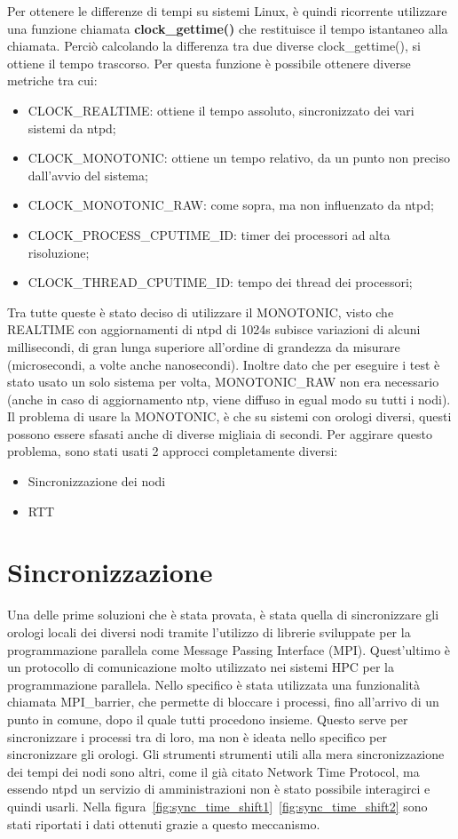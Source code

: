 Per ottenere le differenze di tempi su sistemi Linux, è quindi ricorrente utilizzare una funzione chiamata \textbf{clock\_gettime()} che restituisce il tempo istantaneo alla chiamata. Perciò calcolando la differenza tra due diverse clock\_gettime(), si ottiene il tempo trascorso.
Per questa funzione è possibile ottenere diverse metriche tra cui:
\begin{itemize}
    \item CLOCK\_REALTIME: ottiene il tempo assoluto, sincronizzato dei vari sistemi da ntpd;
    \item CLOCK\_MONOTONIC: ottiene un tempo relativo, da un punto non preciso dall'avvio del sistema;
    \item CLOCK\_MONOTONIC\_RAW: come sopra, ma non influenzato da ntpd;
    \item CLOCK\_PROCESS\_CPUTIME\_ID: timer dei processori ad alta risoluzione;
    \item CLOCK\_THREAD\_CPUTIME\_ID: tempo dei thread dei processori;
\end{itemize}
Tra tutte queste è stato deciso di utilizzare il MONOTONIC, visto che REALTIME con aggiornamenti di ntpd di 1024s subisce variazioni di alcuni millisecondi\cite{ntpd}, di gran lunga superiore all'ordine di grandezza da misurare (microsecondi, a volte anche nanosecondi). Inoltre dato che per eseguire i test è stato usato un solo sistema per volta, MONOTONIC\_RAW non era necessario (anche in caso di aggiornamento ntp, viene diffuso in egual modo su tutti i nodi).
Il problema di usare la MONOTONIC, è che su sistemi con orologi diversi, questi possono essere sfasati anche di diverse migliaia di secondi. Per aggirare questo problema, sono stati usati 2 approcci completamente diversi:
\begin{itemize}
    \item Sincronizzazione dei nodi
    \item RTT
\end{itemize} 

\section{Sincronizzazione}\label{sec:timesync}
Una delle prime soluzioni che è stata provata, è stata quella di sincronizzare gli orologi locali dei diversi nodi tramite l'utilizzo di librerie sviluppate per la programmazione parallela come Message Passing Interface (MPI). Quest'ultimo è un protocollo di comunicazione molto utilizzato nei sistemi HPC per la programmazione parallela.
Nello specifico è stata utilizzata una funzionalità chiamata MPI\_barrier, che permette di bloccare i processi, fino all'arrivo di un punto in comune, dopo il quale tutti procedono insieme. Questo serve per sincronizzare i processi tra di loro, ma non è ideata nello specifico per sincronizzare gli orologi. Gli strumenti strumenti utili alla mera sincronizzazione dei tempi dei nodi sono altri, come il già citato Network Time Protocol,
ma essendo ntpd un servizio di amministrazioni non è stato possibile interagirci e quindi usarli. Nella figura~\ref{fig:sync_time_shift1}~\ref{fig:sync_time_shift2} sono stati riportati i dati ottenuti grazie a questo meccanismo.

